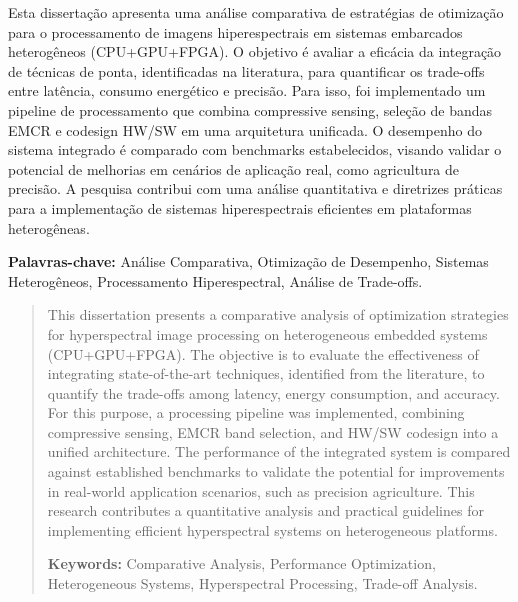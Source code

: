 \documentclass[12pt,Final,Portugues]{tese-FT}
\begin{document}
\maketitle




\begin{resumo}

Esta dissertação apresenta uma análise comparativa de estratégias de otimização para o processamento de imagens hiperespectrais em sistemas embarcados heterogêneos (CPU+GPU+FPGA). O objetivo é avaliar a eficácia da integração de técnicas de ponta, identificadas na literatura, para quantificar os trade-offs entre latência, consumo energético e precisão. Para isso, foi implementado um pipeline de processamento que combina compressive sensing, seleção de bandas EMCR e codesign HW/SW em uma arquitetura unificada. O desempenho do sistema integrado é comparado com benchmarks estabelecidos, visando validar o potencial de melhorias em cenários de aplicação real, como agricultura de precisão. A pesquisa contribui com uma análise quantitativa e diretrizes práticas para a implementação de sistemas hiperespectrais eficientes em plataformas heterogêneas.

\textbf{Palavras-chave:} Análise Comparativa, Otimização de Desempenho, Sistemas Heterogêneos, Processamento Hiperespectral, Análise de Trade-offs.
\end{resumo}

\begin{abstract}

This dissertation presents a comparative analysis of optimization strategies for hyperspectral image processing on heterogeneous embedded systems (CPU+GPU+FPGA). The objective is to evaluate the effectiveness of integrating state-of-the-art techniques, identified from the literature, to quantify the trade-offs among latency, energy consumption, and accuracy. For this purpose, a processing pipeline was implemented, combining compressive sensing, EMCR band selection, and HW/SW codesign into a unified architecture. The performance of the integrated system is compared against established benchmarks to validate the potential for improvements in real-world application scenarios, such as precision agriculture. This research contributes a quantitative analysis and practical guidelines for implementing efficient hyperspectral systems on heterogeneous platforms.

\textbf{Keywords:} Comparative Analysis, Performance Optimization, Heterogeneous Systems, Hyperspectral Processing, Trade-off Analysis.
\end{abstract}
\end{document}

